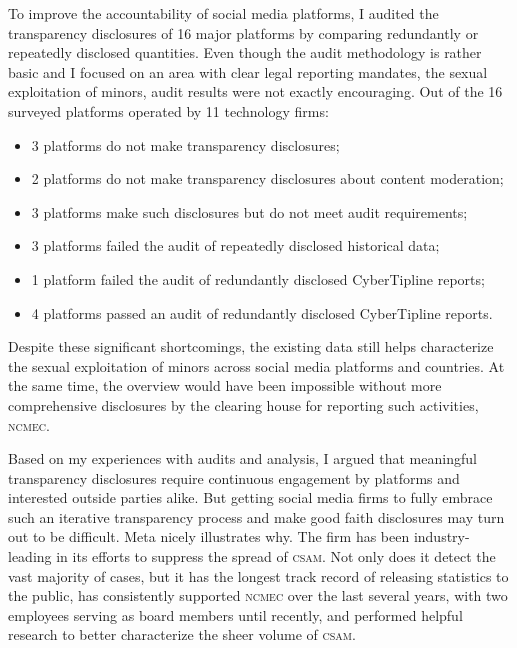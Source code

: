 \documentclass[nonacm,screen]{acmart}
\newcommand\V[1]{\textsc{\MakeLowercase{#1}}}
\begin{document}
To improve the accountability of social media platforms, I audited the
transparency disclosures of 16 major platforms by comparing redundantly or
repeatedly disclosed quantities. Even though the audit methodology is rather
basic and I focused on an area with clear legal reporting mandates, the sexual
exploitation of minors, audit results were not exactly encouraging. Out of the
16 surveyed platforms operated by 11 technology firms:
\begin{itemize}
\item[\ding{56}] 3 platforms do not make transparency disclosures;
\item[\ding{56}] 2 platforms do not make transparency disclosures about content moderation;
\item[\ding{56}] 3 platforms make such disclosures but do not meet audit requirements;
\item[\ding{56}] 3 platforms failed the audit of repeatedly disclosed historical data;
\item[\ding{56}] 1 platform failed the audit of redundantly disclosed CyberTipline reports;
\item[\ding{52}] 4 platforms passed an audit of redundantly disclosed CyberTipline reports.
\end{itemize}
Despite these significant shortcomings, the existing data still helps
characterize the sexual exploitation of minors across social media platforms and
countries. At the same time, the overview would have been impossible without
more comprehensive disclosures by the clearing house for reporting such
activities, \V{NCMEC}.

Based on my experiences with audits and analysis, I argued that meaningful
transparency disclosures require continuous engagement by platforms and
interested outside parties alike. But getting social media firms to fully
embrace such an iterative transparency process and make good faith disclosures
may turn out to be difficult. Meta nicely illustrates why. The firm has been
industry-leading in its efforts to suppress the spread of \V{CSAM}. Not only
does it detect the vast majority of cases, but it has the longest track record
of releasing statistics to the public, has consistently supported \V{NCMEC} over
the last several years, with two employees serving as board members until
recently, and performed helpful research to better characterize the sheer volume
of \V{CSAM}.
\end{document}
